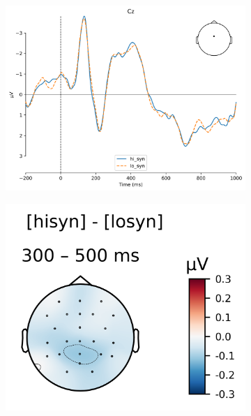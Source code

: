 \documentclass[a4paper, man, floatsintext]{apa7}
\begin{document}
\begin{figure}[H]
    \begin{subfigure}[t]{0.74\textwidth}
         \centering
        \caption{}
         \label{fig:erp_syn_ERP}
         \includegraphics[width=\textwidth]{images/ERP_subj_Cz.png}
     \end{subfigure}
     \hfill
     \begin{subfigure}[t]{0.25\textwidth}
         \centering
        \caption{}
         \label{fig:erp_syn_topo}
         \includegraphics[width=\textwidth]{images/topo_subj-nsubj_300_500.png}
     \end{subfigure}
\end{figure} 
\end{document}
